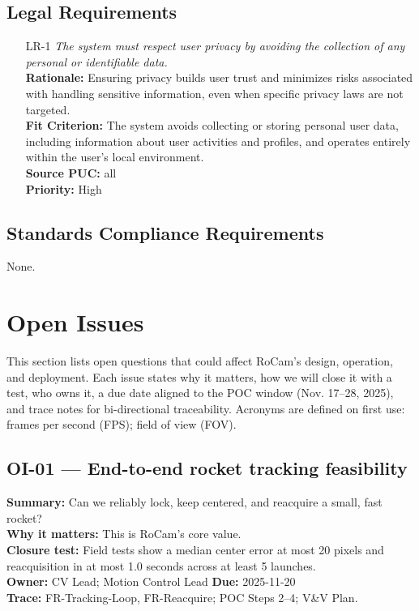\documentclass[12pt]{article}
\begin{document}
\subsection{Legal Requirements}
\begin{itemize}[leftmargin=*]
  \item[LR-1] \emph{The system must respect user privacy by avoiding the collection of
          any personal or identifiable data.}\\[2mm]
        \textbf{Rationale:} Ensuring privacy builds user trust and minimizes risks associated with handling sensitive information, even when specific privacy laws are not targeted.\\
        \textbf{Fit Criterion:} The system avoids collecting or storing personal user data, including information about user activities and profiles, and operates entirely within the user's local environment.\\
        \textbf{Source PUC:} all \\
        \textbf{Priority:} High
\end{itemize}

\subsection{Standards Compliance Requirements}

None.

\section{Open Issues}
\label{sec:open-issues}

This section lists open questions that could affect RoCam’s design, operation, and deployment. Each issue states why it matters, how we will close it with a test, who owns it, a due date aligned to the POC window (Nov. 17–28, 2025), and trace notes for bi-directional traceability. Acronyms are defined on first use: frames per second (FPS); field of view (FOV).

\subsection*{OI-01 — End-to-end rocket tracking feasibility}
\textbf{Summary:} Can we reliably lock, keep centered, and reacquire a small, fast rocket?\\
\textbf{Why it matters:} This is RoCam’s core value.\\
\textbf{Closure test:} Field tests show a median center error at most 20 pixels and reacquisition in at most 1.0 seconds across at least 5 launches.\\
\textbf{Owner:} CV Lead; Motion Control Lead \quad \textbf{Due:} 2025-11-20\\
\textbf{Trace:} FR-Tracking-Loop, FR-Reacquire; POC Steps 2–4; V\&V Plan.
\end{document}
